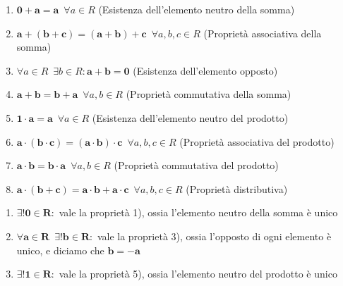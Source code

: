 \documentclass[11pt, a4paper, titlepage, oneside]{scrbook}
\begin{document}
\begin{Proprieta}
\label{prop-somma-prod}
\begin{enumerate}
    \item $\bm{0 + a = a} \enspace \forall a \in R$ \enspace (Esistenza dell'elemento neutro della somma)
    \item $\bm{a + (b + c) = (a + b) + c} \enspace \forall a,b,c \in R$ \enspace (Proprietà associativa della somma)
    \item $\forall a \in R \enspace \exists b \in R : \bm{a + b = 0}$ \enspace (Esistenza dell'elemento opposto)
    \item $\bm{a + b = b + a} \enspace \forall a,b \in R$ \enspace (Proprietà commutativa della somma)
    \item $\bm{1 \cdot a = a} \enspace \forall a \in R$ \enspace (Esistenza dell'elemento neutro del prodotto)
    \item $\bm{a \cdot (b \cdot c) = (a \cdot b) \cdot c} \enspace \forall a,b,c \in R$ \enspace (Proprietà associativa del prodotto)
    \item $\bm{a \cdot b = b \cdot a} \enspace \forall a,b \in R$ \enspace (Proprietà commutativa del prodotto)
    \item $\bm{a \cdot (b + c) = a \cdot b + a \cdot c} \enspace \forall a,b,c \in R$ \enspace (Proprietà distributiva)
\end{enumerate}
\end{Proprieta}

\begin{Osservazione}[]
\label{oss-prop-somma-prod}
\begin{enumerate}
    \item $\bm{\exists ! 0 \in R}:$ vale la proprietà 1), ossia l'elemento neutro della somma è unico
    \item $\bm{\forall a \in R \enspace \exists! b \in R}:$ vale la proprietà 3), ossia l'opposto di ogni elemento è unico, e diciamo che $\bm{b = -a}$
    \item $\bm{\exists! 1 \in R}:$ vale la proprietà 5), ossia l'elemento neutro del prodotto è unico
\end{enumerate}
\end{Osservazione}

\Dimostrazione 
\end{document}
